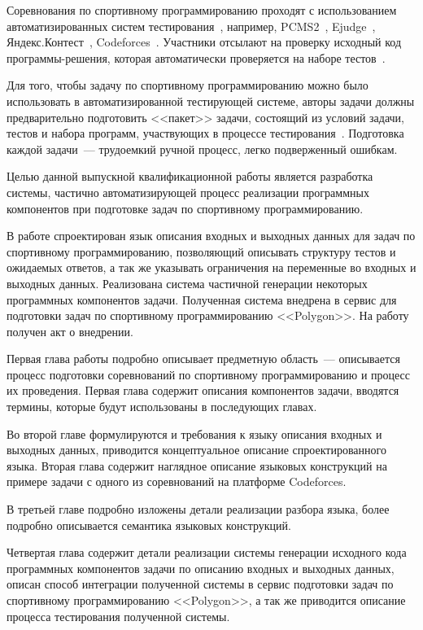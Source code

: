 \documentclass[times,specification,annotation]{style/itmo-student-thesis/itmo-student-thesis}
\begin{document}
\tableofcontents

\startprefacepage

Соревнования по спортивному программированию проходят с использованием автоматизированных систем тестирования~\cite{korneev-elizarov-pcms}, например, PCMS2~\cite{pcms2bachelor}, Ejudge~\cite{ejudgedocs}, Яндекс.Контест~\cite{yacontest}, Codeforces~\cite{codeforces}. Участники отсылают на проверку исходный код программы-решения, которая автоматически проверяется на наборе тестов~\cite{competative-prog-wiki}.

Для того, чтобы задачу по спортивному программированию можно было использовать в автоматизированной тестирующей системе, авторы задачи должны предварительно подготовить <<пакет>> задачи, состоящий из условий задачи, тестов и набора программ, участвующих в процессе тестирования~\cite{darkcyan-polygon-tutorial}. Подготовка каждой задачи~--- трудоемкий ручной процесс, легко подверженный ошибкам.

Целью данной выпускной квалификационной работы является разработка системы, частично автоматизирующей процесс реализации программных компонентов при подготовке задач по спортивному программированию.

В работе спроектирован язык описания входных и выходных данных для задач по спортивному программированию, позволяющий описывать структуру тестов и ожидаемых ответов, а так же указывать ограничения на переменные во входных и выходных данных. Реализована система частичной генерации некоторых программных компонентов задачи. Полученная система внедрена в сервис для подготовки задач по спортивному программированию <<Polygon>>. На работу получен акт о внедрении.

Первая глава работы подробно описывает предметную область~--- описывается процесс подготовки соревнований по спортивному программированию и процесс их проведения. Первая глава содержит описания компонентов задачи, вводятся термины, которые будут использованы в последующих главах.

Во второй главе формулируются и требования к языку описания входных и выходных данных, приводится концептуальное описание спроектированного языка. Вторая глава содержит наглядное описание языковых конструкций на примере задачи с одного из соревнований на платформе Codeforces.

В третьей главе подробно изложены детали реализации разбора языка, более подробно описывается семантика языковых конструкций.

Четвертая глава содержит детали реализации системы генерации исходного кода программных компонентов задачи по описанию входных и выходных данных, описан способ интеграции полученной системы в сервис подготовки задач по спортивному программированию <<Polygon>>, а так же приводится описание процесса тестирования полученной системы.
\end{document}
